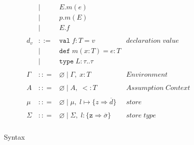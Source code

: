 \documentclass{llncs}
\numberwithin{subcase}{casethm}
\numberwithin{casethm}{theorem}
\numberwithin{casethm}{lemma}
\begin{document}
\begin{figure}[h]
\[\begin{array}{lll}
\begin{array}{lllr}
       & | & E.m(e)\\
       & | & p.m(E)\\
       & | & E.f\\
&&\\
d_v & ::= & \texttt{val} \; f : T = v & declaration \; value \\
  & |   & \texttt{def} \; m(x:T) = e : T &\\
  & |   & \texttt{type} \; L : \tau .. \tau &\\
&&\\
\Gamma & :: = & \varnothing \; | \; \Gamma,\; x : T & Environment \\
&&\\
A & :: = & \varnothing \; | \; A,\;  <: T & Assumption \; Context \\
&&\\
\mu & :: = & \varnothing \; | \; \mu,\; l \mapsto \{z \Rightarrow \overline{d}\} & store \\
&&\\
\Sigma & :: = & \varnothing \; | \; \Sigma,\; l : \{\texttt{z} \Rightarrow \overline{\sigma}\} & store \; type \\
\end{array}
\end{array}
\]
\caption{Syntax}
\label{f:syntax}
\end{figure}




\end{document}
